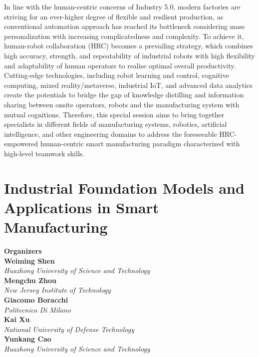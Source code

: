 In line with the human-centric concerns of Industry 5.0, modern factories are striving for an ever-higher degree of flexible and resilient production, as conventional automation approach has reached its bottleneck considering mass personalization with increasing complicatedness and complexity. To achieve it, human-robot collaboration (HRC) becomes a prevailing strategy, which combines high accuracy, strength, and repeatability of industrial robots with high flexibility and adaptability of human operators to realise optimal overall productivity. Cutting-edge technologies, including robot learning and control, cognitive computing, mixed reality/metaverse, industrial IoT, and advanced data analytics create the potentials to bridge the gap of knowledge distilling and information sharing between onsite operators, robots and the manufacturing system with mutual cognitions. Therefore, this special session aims to bring together specialists in different fields of manufacturing systems, robotics, artificial intelligence, and other engineering domains to address the foreseeable HRC-empowered human-centric smart manufacturing paradigm characterized with high-level teamwork skills. 

\section{Industrial Foundation Models and Applications in Smart Manufacturing}


\large \textbf{Organizers} \normalsize \vspace{2mm} \\
\textbf{Weiming  Shen} \\ 
\textit{Huazhong University of Science and Technology} \vspace{{2mm}} \\
\textbf{Mengchu  Zhou} \\ 
\textit{New Jersey Institute of Technology} \vspace{{2mm}} \\
\textbf{Giacomo  Boracchi} \\ 
\textit{Politecnico Di Milano} \vspace{{2mm}} \\
\textbf{Kai  Xu} \\ 
\textit{National University of Defense Technology} \vspace{{2mm}} \\
\textbf{Yunkang  Cao} \\ 
\textit{Huazhong University of Science and Technology}

